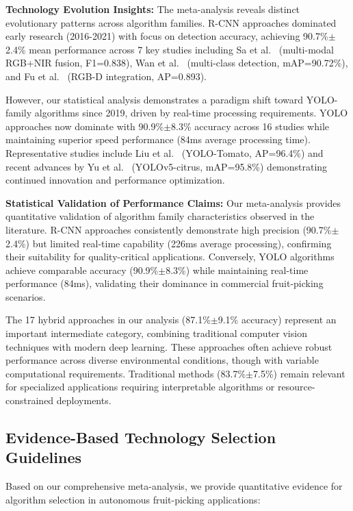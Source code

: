 \documentclass[pdflatex,sn-mathphys-num]{sn-jnl}
\begin{document}
\textbf{Technology Evolution Insights:} The meta-analysis reveals distinct evolutionary patterns across algorithm families. R-CNN approaches dominated early research (2016-2021) with focus on detection accuracy, achieving 90.7\%$\pm$2.4\% mean performance across 7 key studies including Sa et al.~\cite{sa2016deepfruits} (multi-modal RGB+NIR fusion, F1=0.838), Wan et al.~\cite{wan2020faster} (multi-class detection, mAP=90.72\%), and Fu et al.~\cite{fu2020faster} (RGB-D integration, AP=0.893).

However, our statistical analysis demonstrates a paradigm shift toward YOLO-family algorithms since 2019, driven by real-time processing requirements. YOLO approaches now dominate with 90.9\%$\pm$8.3\% accuracy across 16 studies while maintaining superior speed performance (84ms average processing time). Representative studies include Liu et al.~\cite{liu2020yolo} (YOLO-Tomato, AP=96.4\%) and recent advances by Yu et al.~\cite{yu2024object} (YOLOv5-citrus, mAP=95.8\%) demonstrating continued innovation and performance optimization.

\textbf{Statistical Validation of Performance Claims:} Our meta-analysis provides quantitative validation of algorithm family characteristics observed in the literature. R-CNN approaches consistently demonstrate high precision (90.7\%$\pm$2.4\%) but limited real-time capability (226ms average processing), confirming their suitability for quality-critical applications. Conversely, YOLO algorithms achieve comparable accuracy (90.9\%$\pm$8.3\%) while maintaining real-time performance (84ms), validating their dominance in commercial fruit-picking scenarios.

The 17 hybrid approaches in our analysis (87.1\%$\pm$9.1\% accuracy) represent an important intermediate category, combining traditional computer vision techniques with modern deep learning. These approaches often achieve robust performance across diverse environmental conditions, though with variable computational requirements. Traditional methods (83.7\%$\pm$7.5\%) remain relevant for specialized applications requiring interpretable algorithms or resource-constrained deployments.

\subsection{Evidence-Based Technology Selection Guidelines}
Based on our comprehensive meta-analysis, we provide quantitative evidence for algorithm selection in autonomous fruit-picking applications:
\end{document}
